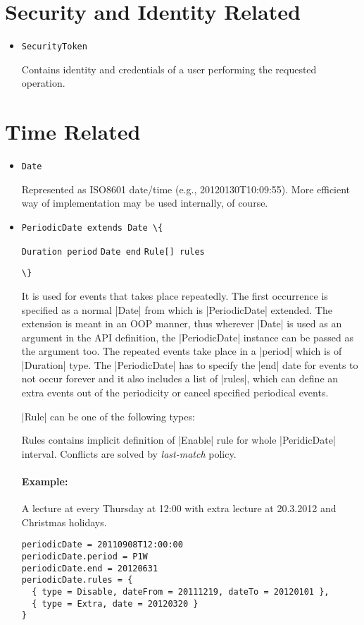\documentclass[a4paper]{report}
\newcommand{\APIcode}[1]{\lstinline[style=myinline]!#1!}
\newcommand{\APIcmd}[1]{%
\item \lstinline[style=myinline]!#1!%

}
\newenvironment{APItype}[1]{
  \item \APIcode{#1 \{}
}{
  \newline \APIcode{\}}%
  
}
\newcommand{\APItypemem}[1]{\newline \hspace*{5mm} \lstinline[style=myinline]!#1!}
\newenvironment{APIdef}{\begin{itemize}}{\end{itemize}}
\begin{document}
\section{Security and Identity Related}

\begin{APIdef}

\APIcmd{SecurityToken}
Contains identity and credentials of a user performing the requested operation.

\end{APIdef}


\section{Time Related}

\begin{APIdef}

\APIcmd{Date}
Represented as ISO8601 date/time (e.g., 20120130T10:09:55). More efficient way of implementation may be used internally, of course.

\begin{APItype}{PeriodicDate extends Date}
\APItypemem{Duration period}
\APItypemem{Date end}
\APItypemem{Rule[] rules}
\end{APItype}
It is used for events that takes place repeatedly. The first occurrence is specified as a normal |Date| from which is |PeriodicDate| extended. The extension is meant in an OOP manner, thus wherever |Date| is used as an argument in the API definition, the |PeriodicDate| instance can be passed as the argument too. The repeated events take place in a |period| which is of |Duration| type. The |PeriodicDate| has to specify the |end| date for events to not occur forever and it also includes a list of |rules|, which can define an extra events out of the periodicity or cancel specified periodical events.

|Rule| can be one of the following types:
Rules contains implicit definition of |Enable| rule for whole |PeridicDate| interval. Conflicts are solved by \emph{last-match} policy.

\paragraph{Example:}
A lecture at every Thursday at 12:00 with extra lecture at 20.3.2012 and Christmas holidays.
\begin{verbatim}
periodicDate = 20110908T12:00:00
periodicDate.period = P1W
periodicDate.end = 20120631
periodicDate.rules = {
  { type = Disable, dateFrom = 20111219, dateTo = 20120101 },
  { type = Extra, date = 20120320 }
}
\end{verbatim}



\end{APIdef}
\end{document}
